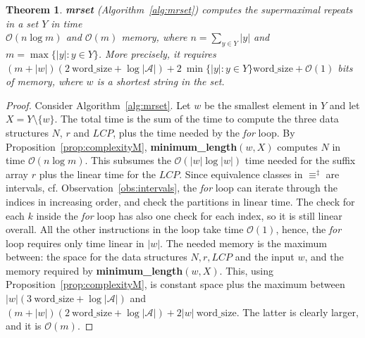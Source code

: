 \documentclass[submission]{dmtcs}
\newcommand{\Ode}{{\mathcal O}}
\newcommand\+[1]{\mathcal{#1}}
\newtheorem{theorem}{Theorem}
\begin{document}
\begin{theorem}\label{thm:complexity_mrset}
{\bf mrset} (Algorithm~\ref{alg:mrset}) 
computes the supermaximal repeats in a set $Y$
in time \\$\Ode(n \log m)$  and $\Ode(m)$ memory,
where $n=\sum_{y \in Y} |y|$ and $m=\max \{|y| : y \in Y\}$.
More precisely, it requires
	$(m+|w|) (2 \ \mbox{word\_size} + \log |\+A| ) + 2 \ \min\{|y| : 
y\in Y\} \mbox{word\_size} + \Ode(1)$ bits of memory, where $w$ is a shortest
string in the set.

\end{theorem}
\begin{proof}
Consider Algorithm~\ref{alg:mrset}.
Let $w$ be the smallest element in $Y$ and let $X=Y\setminus\{w\}$.
The total time is the sum of the time to compute the three
data structures $N$, $r$ and $LCP$, plus the time needed 
by the	{\em for} loop.
By Proposition~\ref{prop:complexityM}, 
 {\bf minimum\_length}$(w,X)$ 
 computes $N$ in time
$\Ode(n \log m)$.
This subsumes the $\Ode(|w| \log |w|)$ time needed for
the suffix array $r$ plus the linear time for the $LCP$.
Since equivalence classes in 
$\equiv^\ddagger$ are intervals, cf. Observation~\ref{obs:intervals},
the {\em for} loop can iterate through the indices  
in increasing order, and check the partitions in linear time.
The check for each $k$ inside the {\em for} loop 
has also one check for each index, so it
is still linear overall.
All the other instructions in the loop take time $\Ode(1)$,
hence, the {\em for} loop requires only time linear in $|w|$.
%
The needed memory is the maximum between:
the space for the data structures $N,r,LCP$ and the input $w$,
and the memory required by {\bf minimum\_length}$(w,X)$.
This, using Proposition~\ref{prop:complexityM}, is constant space
plus the maximum between
$|w|(3\ \mbox{word\_size} +\log|\+A|)$
and
$(m+|w|) (2\ \mbox{word\_size} + \log |\+A|) + 2|w|\ \mbox{word\_size}$.
The latter is clearly larger, and it is $\Ode(m)$.
\end{proof}
\end{document}
